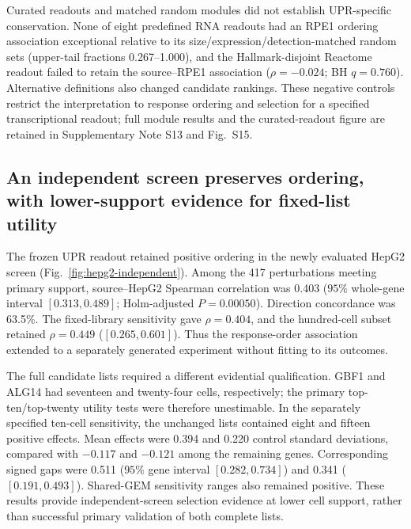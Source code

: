 \documentclass[a4paper,fleqn]{cas-sc}
\makeatletter
\DeclareRobustCommand{\rev}[1]{{\color{red}\def\@citecolor{black}\def\@linkcolor{red}\def\@urlcolor{red}#1}}
\makeatother
\begin{document}
\FloatBarrier

\rev{Curated readouts and matched random modules did not establish UPR-specific conservation.} \rev{None of eight predefined RNA readouts had an RPE1 ordering association exceptional relative to its size/expression/detection-matched random sets (upper-tail fractions 0.267--1.000), and the Hallmark-disjoint Reactome readout failed to retain the source--RPE1 association ($\rho=-0.024$; BH $q=0.760$).} \rev{Alternative definitions also changed candidate rankings.} \rev{These negative controls restrict the interpretation to response ordering and selection for a specified transcriptional readout; full module results and the curated-readout figure are retained in Supplementary Note S13 and Fig.~S15.}

\subsection{\rev{An independent screen preserves ordering, with lower-support evidence for fixed-list utility}}

\rev{The frozen UPR readout retained positive ordering in the newly evaluated HepG2 screen (Fig.~\ref{fig:hepg2-independent}).} \rev{Among the 417 perturbations meeting primary support, source--HepG2 Spearman correlation was 0.403 ($95\%$ whole-gene interval $[0.313,0.489]$; Holm-adjusted $P=0.00050$).} \rev{Direction concordance was 63.5\%.} \rev{The fixed-library sensitivity gave $\rho=0.404$, and the hundred-cell subset retained $\rho=0.449$ ($[0.265,0.601]$).} \rev{Thus the response-order association extended to a separately generated experiment without fitting to its outcomes.}

\rev{The full candidate lists required a different evidential qualification.} \rev{GBF1 and ALG14 had seventeen and twenty-four cells, respectively; the primary top-ten/top-twenty utility tests were therefore unestimable.} \rev{In the separately specified ten-cell sensitivity, the unchanged lists contained eight and fifteen positive effects.} \rev{Mean effects were 0.394 and 0.220 control standard deviations, compared with $-0.117$ and $-0.121$ among the remaining genes.} \rev{Corresponding signed gaps were 0.511 ($95\%$ gene interval $[0.282,0.734]$) and 0.341 ($[0.191,0.493]$).} \rev{Shared-GEM sensitivity ranges also remained positive.} \rev{These results provide independent-screen selection evidence at lower cell support, rather than successful primary validation of both complete lists.}
\end{document}
